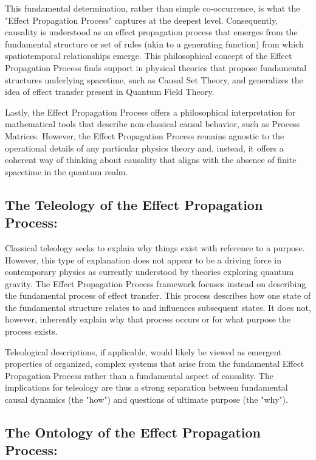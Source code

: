 \documentclass{article}
\begin{document}
This fundamental determination, rather than simple co-occurrence, is what the "Effect Propagation Process" captures at the deepest level. Consequently, causality is understood as an effect propagation process that emerges from the fundamental structure or set of rules (akin to a generating function) from which spatiotemporal relationships emerge. This philosophical concept of the Effect Propagation Process finds support in physical theories that propose fundamental structures underlying spacetime, such as Causal Set Theory, and generalizes the idea of effect transfer present in Quantum Field Theory.

Lastly, the Effect Propagation Process offers a philosophical interpretation for mathematical tools that describe non-classical causal behavior, such as Process Matrices. However, the Effect Propagation Process remains agnostic to the operational details of any particular physics theory and, instead, it offers a coherent way of thinking about causality that aligns with the absence of finite spacetime in the quantum realm.


\newpage

\subsection{The Teleology of the Effect Propagation Process:}
\label{subsec:epp_teleology}

Classical teleology seeks to explain why things exist with  reference to a purpose. However, this type of explanation does not appear to be a driving force in contemporary physics as currently understood by theories exploring quantum gravity. The Effect Propagation Process framework focuses instead on describing the fundamental process of effect transfer. This process describes how one state of the fundamental structure relates to and influences subsequent states. It does not, however, inherently explain why that process occurs or for what purpose the process exists.

Teleological descriptions, if applicable, would likely be viewed as emergent properties of organized, complex systems that arise from the fundamental Effect Propagation Process rather than a fundamental aspect of causality. The implications for teleology are thus a strong separation between fundamental causal dynamics (the "how") and questions of ultimate purpose (the "why").


\subsection{The Ontology of the Effect Propagation Process:}
\label{subsec:epp_ontology}
\end{document}
